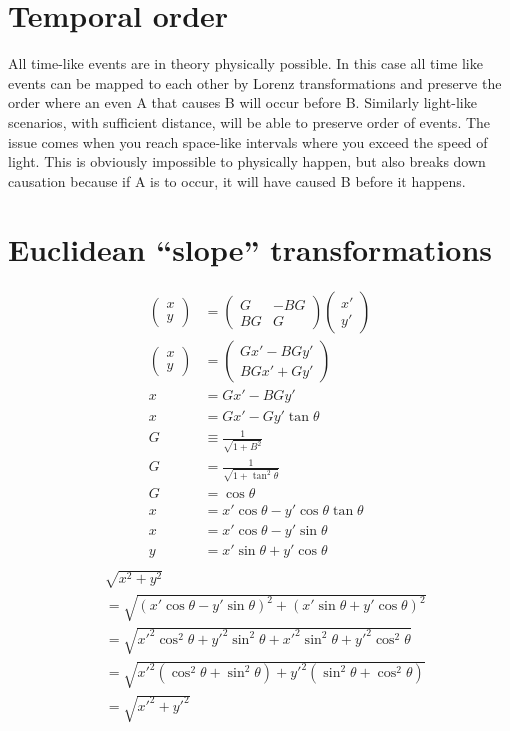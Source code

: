 \documentclass[11pt,letterpaper, twocolumn]{article}
\begin{document}
\section{Temporal order}
All time-like events are in theory physically possible. In this case all time like events can be mapped to each other by Lorenz transformations and preserve the order where an even A that causes B will occur before B. Similarly light-like scenarios, with sufficient distance, will be able to preserve order of events. The issue comes when you reach space-like intervals where you exceed the speed of light. This is obviously impossible to physically happen, but also breaks down causation because if A is to occur, it will have caused B before it happens. 

\section{Euclidean “slope” transformations}
\begin{align*}
    \begin{pmatrix}x\\y\end{pmatrix} &= \begin{pmatrix}G&-BG\\BG&G\end{pmatrix}\begin{pmatrix}x'\\y'\end{pmatrix}\\
    \begin{pmatrix}x\\y\end{pmatrix}&=\begin{pmatrix}Gx' - BGy' \\ BGx'+Gy'\end{pmatrix}\\
    x&=Gx' - BGy'\\
    x&=Gx' - Gy'\tan\theta\\
    G & \equiv \frac{1}{\sqrt{1+B^2}}\\
    G &= \frac{1}{\sqrt{1+\tan^2\theta}}\\
    G &= \cos\theta\\
    x&=x'\cos\theta - y'\cos\theta\tan\theta\\
    x&=x'\cos\theta - y'\sin\theta\\
    y&=x'\sin\theta+y'\cos\theta\\
\end{align*}
\begin{align*}
    &\sqrt{x^2+y^2}\\
    &=\sqrt{(x'\cos\theta - y'\sin\theta)^2+(x'\sin\theta+y'\cos\theta)^2}\\
    &=\sqrt{x'^2\cos^2\theta + y'^2\sin^2\theta +x'^2\sin^2\theta+y'^2\cos^2\theta}\\
    &=\sqrt{x'^2(\cos^2\theta + \sin^2\theta) + y'^2(\sin^2\theta +\cos^2\theta)}\\
    &=\sqrt{x'^2+ y'^2}\\
\end{align*}
\end{document}

